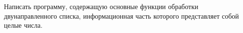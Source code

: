 Написать программу, содержащую основные функции обработки
двунаправленного списка, информационная часть которого представляет собой
целые числа.